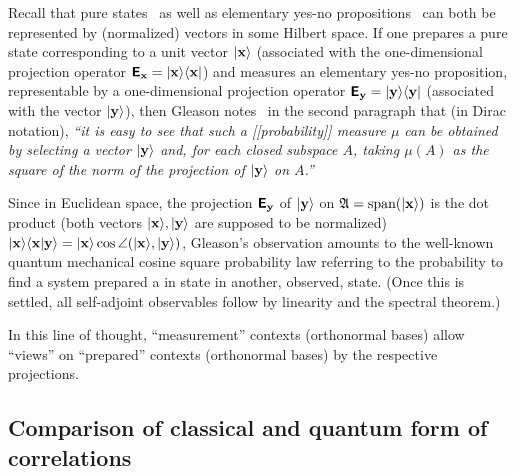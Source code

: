 \documentclass[%
  twocolumn,
 showpacs,
 showkeys,
 preprintnumbers,
 amsmath,amssymb,
 aps,
  pra,
  longbibliography,
 floatfix,
 ]{revtex4-1}
\begin{document}
Recall that pure states~\cite{Dirac621,dirac}
as well as elementary yes-no propositions~\cite{v-neumann-49,v-neumann-55,birkhoff-36} can both
be represented by (normalized) vectors in some Hilbert space.
If one prepares a pure state corresponding to a unit vector
$\vert {\bf x} \rangle$ (associated with the one-dimensional projection operator
$\textsf{\textbf{E}}_{\bf x}=\vert {\bf x} \rangle \langle {\bf x} \vert $)
and measures an elementary yes-no proposition, representable by a one-dimensional projection operator
$\textsf{\textbf{E}}_{\bf y}=\vert {\bf y} \rangle \langle {\bf y} \vert $
(associated with the vector
$\vert {\bf y} \rangle$),
then Gleason notes~\cite[p.~885]{Gleason} in the second paragraph that (in Dirac notation),
{\em  ``it is easy to see that such a [[probability]] measure $\mu$
can be obtained by selecting a vector $\vert {\bf y} \rangle$
and, for each closed subspace $A$, taking $\mu ({A})$ as the square of the norm of the
projection %
of $\vert {\bf y} \rangle$  on ${A}$.''}

Since in Euclidean space, the
projection $\textsf{\textbf{E}}_{\bf y}$
of $\vert {\bf y} \rangle$  on $\mathfrak{A} = \text{span} (\vert {\bf x} \rangle)$
is the dot product  (both vectors $\vert {\bf x} \rangle , \vert {\bf y} \rangle$
are supposed to be normalized)
$
\vert {\bf x} \rangle  \langle {\bf x} \vert {\bf y} \rangle  =
\vert {\bf x} \rangle  \cos \angle (\vert {\bf x} \rangle , \vert {\bf y} \rangle )
$,
Gleason's observation amounts to the well-known quantum mechanical cosine square probability law
referring to the probability to find a system prepared a in state in another, observed, state.
(Once this is settled, all self-adjoint observables follow by linearity and the spectral theorem.)

In this line of thought, ``measurement'' contexts (orthonormal bases)
allow ``views'' on  ``prepared'' contexts (orthonormal bases)
by the respective projections.




\subsection{Comparison of classical and quantum form of correlations}
\end{document}
